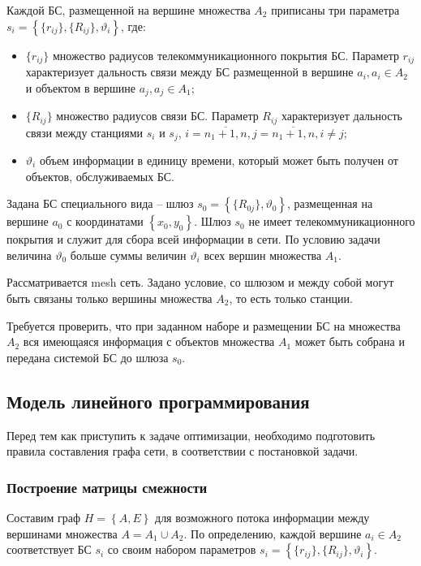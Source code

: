 Каждой БС, размещенной на вершине множества $A_2$ приписаны три параметра $s_i = \left\{ \{r_{ij}\}, \{R_{ij}\},\vartheta_i \right\} $, где:

\begin{itemize}
    \item $\{r_{ij}\}$ множество радиусов телекоммуникационного покрытия БС. Параметр $r_{ij}$ характеризует дальность связи между БС размещенной в вершине $a_i, a_i \in A_2$ и объектом в вершине $a_j, a_j \in A_1$;
    \item $\{R_{ij}\}$  множество радиусов связи БС. Параметр $R_{ij}$ характеризует дальность связи между станциями $s_i$ и $s_j$, $i= \overline{n_1+1,n}, j = \overline{n_1+1,n}, i \neq j$;
    \item $\vartheta_i$  объем информации в единицу времени, который может быть получен от объектов, обслуживаемых БС.
\end{itemize}

Задана БС специального вида -- шлюз  $s_0 = \left\{\{R_{0j}\}, \vartheta_0 \right\} $, размещенная на вершине $a_0$ с координатами $\left\{x_0, y_0 \right\}$. Шлюз $s_0$ не имеет телекоммуникационного покрытия и служит для сбора всей информации в сети. По условию задачи величина $\vartheta_0$ больше суммы величин $\vartheta_i$ всех вершин множества $A_1$.

Рассматривается mesh сеть. Задано условие, со шлюзом и между собой могут быть связаны только вершины множества $A_2$, то есть только станции.

Требуется проверить, что при заданном наборе и размещении БС на множества $A_2$ вся имеющаяся информация с объектов множества $A_1$ может быть собрана и передана системой БС  до шлюза $s_0$.

\subsection{Модель линейного программирования}
Перед тем как приступить к задаче оптимизации, необходимо подготовить правила составления графа сети, в соответствии с постановкой задачи.

\subsubsection{Построение матрицы смежности}

Составим граф $ H = \left\{A,E \right\} $ для возможного потока информации между вершинами множества $ A = A_1 \cup A_2 $. По определению, каждой вершине $a_i \in A_2 $ соответствует БС $s_i$ со своим набором параметров $s_i = \left\{ \{r_{ij}\}, \{R_{ij}\},\vartheta_i \right\} $.

